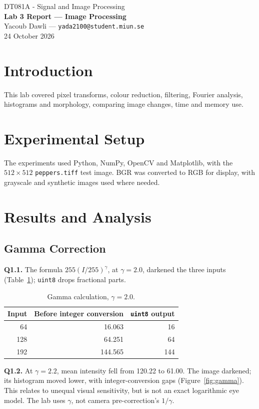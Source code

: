 \documentclass[10pt,a4paper]{article}
\begin{document}
\begin{center}
{\large DT081A - Signal and Image Processing}\\[2pt]
{\large\bfseries Lab 3 Report --- Image Processing}\\[3pt]
Yacoub Dawli --- \texttt{yada2100@student.miun.se}\\[2pt]
{\small 24 October 2026}
\end{center}
\vspace{-5pt}

\section{Introduction}
This lab covered pixel transforms, colour reduction, filtering, Fourier analysis,
histograms and morphology, comparing image changes, time and memory use.

\section{Experimental Setup}
The experiments used Python, NumPy, OpenCV and Matplotlib, with the \(512\times512\) \texttt{peppers.tiff} test image. BGR was converted to RGB for display, with grayscale and synthetic images used where needed.

\section{Results and Analysis}
\subsection{Gamma Correction}
\textbf{Q1.1.} The formula \(255(I/255)^\gamma\), at \(\gamma=2.0\), darkened the three inputs
(Table~\ref{tab:gamma}); \texttt{uint8} drops fractional parts.

\begin{table}[H]
\centering
\caption{Gamma calculation, \(\gamma=2.0\).}\label{tab:gamma}
\begin{tabular}{rrr}\toprule
Input & Before integer conversion & \texttt{uint8} output\\\midrule
64 & 16.063 & 16\\
128 & 64.251 & 64\\
192 & 144.565 & 144\\\bottomrule
\end{tabular}
\end{table}

\textbf{Q1.2.} At \(\gamma=2.2\), mean intensity fell from 120.22 to 61.00.
The image darkened; its histogram moved lower, with integer-conversion gaps
(Figure~\ref{fig:gamma}). This relates to unequal visual sensitivity, but is not
an exact logarithmic eye model. The lab uses \(\gamma\), not camera pre-correction's \(1/\gamma\).
\end{document}
